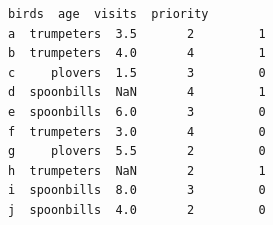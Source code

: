\documentclass[1pt]{article}
\makeatletter
\newcommand{\boxspacing}{\kern\kvtcb@left@rule\kern\kvtcb@boxsep}
\newcommand{\prompt}[4]{
        {\ttfamily\llap{{\color{#2}[#3]:\hspace{3pt}#4}}\vspace{-\baselineskip}}
}
\makeatother
\begin{document}
    \begin{tcolorbox}[breakable, size=fbox, boxrule=.5pt, pad at break*=1mm, opacityfill=0]
        \prompt{Out}{outcolor}{18}{\boxspacing}
        \begin{Verbatim}[commandchars=\\\{\}]
        birds  age  visits  priority
a  trumpeters  3.5       2         1
b  trumpeters  4.0       4         1
c     plovers  1.5       3         0
d  spoonbills  NaN       4         1
e  spoonbills  6.0       3         0
f  trumpeters  3.0       4         0
g     plovers  5.5       2         0
h  trumpeters  NaN       2         1
i  spoonbills  8.0       3         0
j  spoonbills  4.0       2         0
        \end{Verbatim}
    \end{tcolorbox}


\end{document}
